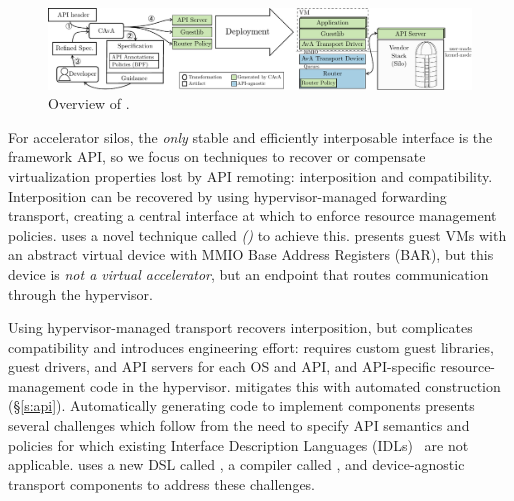 \begin{figure}[!!thp!]
    \centering
    \includegraphics[width=\textwidth]{ava/images/overview.pdf}
    \caption{Overview of \model.}
    \label{fig:overview}
    \vspace*{-1em}
\end{figure}


For accelerator silos, the \emph{only} stable and
efficiently interposable interface is the framework API, so
we focus on techniques to recover or compensate virtualization properties lost by
API remoting: interposition and compatibility.
Interposition can be recovered by using hypervisor-managed forwarding transport,
creating a central interface at which to enforce resource management policies.
\Model uses a novel technique called \emph{\noveltechnique (\novtechabbrv)} to achieve this.
\novtechabbrv presents guest VMs with an abstract virtual device with MMIO Base Address Registers (BAR), but this device is \emph{not a virtual accelerator}, but an endpoint that
routes communication through the hypervisor.

Using hypervisor-managed transport recovers interposition, but complicates compatibility and introduces engineering effort:
\novtechabbrv requires custom guest libraries, guest drivers, and API servers for each OS and API, and API-specific resource-management code in the hypervisor.
\model mitigates this with automated construction (\S\ref{s:api}).
Automatically generating code to implement \novtechabbrv components presents several challenges which
follow from the need to specify API semantics and policies for which
existing Interface Description Languages (IDLs)~\cite{Lamb1987,MSIDL} are not applicable.
\Model uses a new DSL called \speclang, a compiler called \compiler, and device-agnostic transport components to address these challenges.

